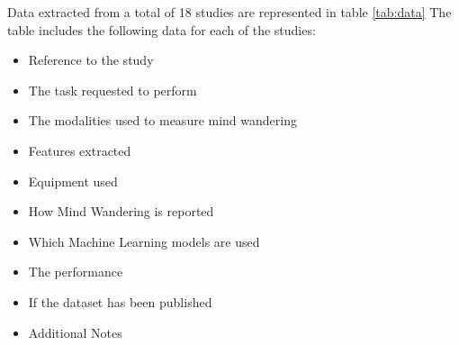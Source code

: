 Data extracted from a total of 18 studies are represented in table \ref{tab:data}
The table includes the following data for each of the studies:
\begin{itemize}
    \item Reference to the study
    \item The task requested to perform
    \item The modalities used to measure mind wandering
    \item Features extracted
    \item Equipment used
    \item How Mind Wandering is reported
    \item Which Machine Learning models are used
    \item The performance
    \item If the dataset has been published
    \item Additional Notes
\end{itemize}

\lipsum[5]
\newpage
\onecolumn

